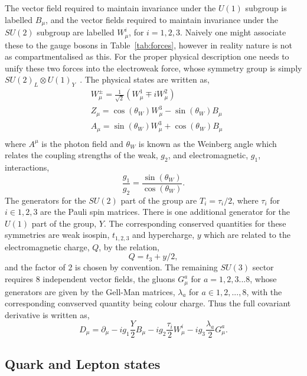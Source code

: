 The vector field required to maintain invariance under the $U(1)$ subgroup is labelled $B_{\mu}$, and the vector fields required to maintain invariance under the $SU(2)$ subgroup are labelled $W^{i}_{\mu}$, for $i=1,2,3$. Naively one might associate these to the \SM gauge bosons in Table~\ref{tab:forces}, however in reality nature is not as compartmentalised as this. For the proper physical description one needs to unify these two forces into the electroweak force, whose symmetry group is simply $SU(2)_{L}\otimes U(1)_{Y}$~\cite{Glashow,Weinberg,Salam}.  The physical states are written as,
\begin{align}
  & W_{\mu}^{\pm} = \frac{1}{\sqrt{2}}(W^{1}_{\mu}\mp iW^{2}_{\mu})\\
  & Z_{\mu} = \cos(\theta_{W})W^{3}_{\mu}-\sin(\theta_{W})B_{\mu}\\
  & A_{\mu} = \sin(\theta_{W})W^{3}_{\mu}+\cos(\theta_{W})B_{\mu}\\
\end{align}
where $A^{\mu}$ is the photon field and $\theta_{W}$ is known as the Weinberg angle which relates the coupling strengths of the weak, $g_{2}$, and electromagnetic, $g_{1}$, interactions,
\begin{equation}
  \frac{g_{1}}{g_{2}} = \frac{\sin(\theta_{W})}{\cos(\theta_{W})}.
\end{equation}
The generators for the $SU(2)$ part of the group are $T_{i}=\tau_{i}/2$, where $\tau_{i}$ for $i\in{1,2,3}$ are the Pauli spin matrices. There is one additional generator for the $U(1)$ part of the group, $Y$. The corresponding conserved quantities for these symmetries are weak isospin, $t_{1,2,3}$ and hypercharge, $y$ which are related to the electromagnetic charge, $Q$, by the relation, 
\begin{equation}
  Q = t_{3}+y/2,
\end{equation}
 and the factor of 2 is chosen by convention. The remaining $SU(3)$ sector requires 8 independent vector fields, the gluons $G_{\mu}^{a}$ for $a=1,2,3...8$, whose generators are given by the Gell-Man matrices, $\lambda_{a}$ for $a\in{1,2,...,8}$, with the corresponding convserved quantity being colour charge. Thus the full covariant derivative is written as,
\begin{equation}
  D_{\mu} = \partial_{\mu}-ig_{1}\frac{Y}{2}B_{\mu} -ig_{2}\frac{\tau_{i}}{2}W_{\mu}^{i} -ig_{3}\frac{\lambda_{a}}{2}G_{\mu}^{a}.
  \label{eq:cov_der}
\end{equation}

\subsection{Quark and Lepton states}

